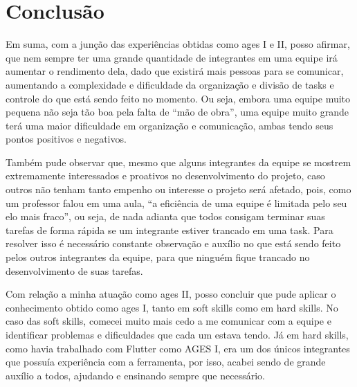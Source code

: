 \section[Conclusão]{Conclusão}

Em suma, com a junção das experiências obtidas como \ac{ages} I e II, posso afirmar, que nem sempre ter uma grande quantidade de integrantes em uma equipe irá aumentar o rendimento dela, dado que existirá mais pessoas para se comunicar, aumentando a complexidade e dificuldade da organização e divisão de tasks e controle do que está sendo feito no momento. Ou seja, embora uma equipe muito pequena não seja tão boa pela falta de “mão de obra”, uma equipe muito grande terá uma maior dificuldade em organização e comunicação, ambas tendo seus pontos positivos e negativos.

Também pude observar que, mesmo que alguns integrantes da equipe se mostrem extremamente interessados e proativos no desenvolvimento do projeto, caso outros não tenham tanto empenho ou interesse o projeto será afetado, pois, como um professor falou em uma aula, “a eficiência de uma equipe é limitada pelo seu elo mais fraco”, ou seja, de nada adianta que todos consigam terminar suas tarefas de forma rápida se um integrante estiver trancado em uma task. Para resolver isso é necessário constante observação e auxílio no que está sendo feito pelos outros integrantes da equipe, para que ninguém fique trancado no desenvolvimento de suas tarefas.

Com relação a minha atuação como \ac{ages} II, posso concluir que pude aplicar o conhecimento obtido como \ac{ages} I, tanto em soft skills como em hard skills. No caso das soft skills, comecei muito mais cedo a me comunicar com a equipe e identificar problemas e dificuldades que cada um estava tendo. Já em hard skills, como havia trabalhado com Flutter como AGES I, era um dos únicos integrantes que possuía experiência com a ferramenta, por isso, acabei sendo de grande auxílio a todos, ajudando e ensinando sempre que necessário.